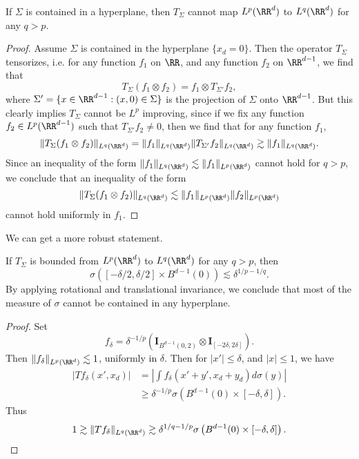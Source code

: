 \begin{theorem}
    If $\Sigma$ is contained in a hyperplane, then $T_\Sigma$ cannot map $L^p(\RR^d)$ to $L^q(\RR^d)$ for any $q > p$. 
\end{theorem}
\begin{proof}
    Assume $\Sigma$ is contained in the hyperplane $\{ x_d = 0 \}$. Then the operator $T_\Sigma$ tensorizes, i.e. for any function $f_1$ on $\RR$, and any function $f_2$ on $\RR^{d-1}$, we find that
    \[ T_\Sigma(f_1 \otimes f_2) = f_1 \otimes T_{\Sigma'} f_2, \]
    where $\Sigma' = \{ x \in \RR^{d-1} : (x,0) \in \Sigma \}$ is the projection of $\Sigma$ onto $\RR^{d-1}$. But this clearly implies $T_\Sigma$ cannot be $L^p$ improving, since if we fix any function $f_2 \in L^p(\RR^{d-1})$ such that $T_{\Sigma'} f_2 \neq 0$, then we find that for any function $f_1$,
    \[ \| T_\Sigma (f_1 \otimes f_2) \|_{L^q(\RR^d)} = \| f_1 \|_{L^q(\RR^d)} \| T_{\Sigma'} f_2 \|_{L^q(\RR^d)} \gtrsim \| f_1 \|_{L^q(\RR^d)}. \]
    Since an inequality of the form $\| f_1 \|_{L^q(\RR^d)} \lesssim \| f_1 \|_{L^p(\RR^d)}$ cannot hold for $q > p$, we conclude that an inequality of the form
    \[ \| T_\Sigma (f_1 \otimes f_2) \|_{L^q(\RR^d)} \lesssim \| f_1 \|_{L^p(\RR^d)} \| f_2 \|_{L^p(\RR^d)} \]
    cannot hold uniformly in $f_1$.
\end{proof}

We can get a more robust statement.

\begin{theorem}
    If $T_\Sigma$ is bounded from $L^p(\RR^d)$ to $L^q(\RR^d)$ for any $q > p$, then
    \[ \sigma \left( [-\delta/2, \delta/2] \times B^{d-1}(0) \right) \lesssim \delta^{1/p - 1/q}. \]
    By applying rotational and translational invariance, we conclude that most of the measure of $\sigma$ cannot be contained in any hyperplane.
\end{theorem}
\begin{proof}
    Set
    \[ f_\delta = \delta^{-1/p} \left( \mathbf{I}_{B^{d-1}(0, 2)} \otimes \mathbf{I}_{[-2\delta,2\delta]} \right). \]
    Then $\| f_\delta \|_{L^p(\RR^d)} \lesssim 1$, uniformly in $\delta$. Then for $|x'| \leq \delta$, and $|x| \leq 1$, we have
    \begin{align*}
        |Tf_\delta(x',x_d)| &= \left| \int f_\delta(x'+y',x_d + y_d) d\sigma(y) \right|\\
        &\geq \delta^{-1/p} \sigma \left( B^{d-1}(0) \times [-\delta,\delta] \right).
    \end{align*}
    Thus
    \[ 1 \gtrsim \| Tf_\delta \|_{L^q(\RR^d)} \gtrsim \delta^{1/q-1/p} \sigma \left( B^{d-1}(0) \times [-\delta,\delta] \right). \qedhere \]
\end{proof}

